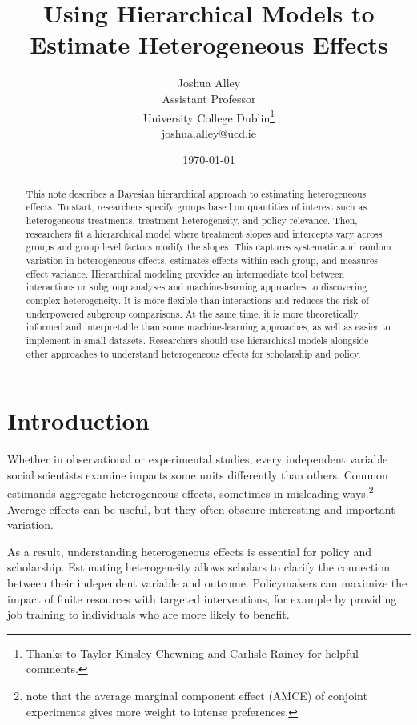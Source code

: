 \documentclass[12pt]{article}
\title{\textbf{Using Hierarchical Models to Estimate Heterogeneous Effects}}
\author{Joshua Alley \\
Assistant Professor \\
University College Dublin\thanks{Thanks to Taylor Kinsley Chewning and Carlisle Rainey for helpful comments.} \\
joshua.alley@ucd.ie
}
\date{\today}
\begin{document}
\maketitle 

\begin{abstract} 
This note describes a Bayesian hierarchical approach to estimating heterogeneous effects. 
To start, researchers specify groups based on quantities of interest such as heterogeneous treatments, treatment heterogeneity, and policy relevance.  
Then, researchers fit a hierarchical model where treatment slopes and intercepts vary across groups and group level factors modify the slopes.
This captures systematic and random variation in heterogeneous effects, estimates effects within each group, and measures effect variance. 
Hierarchical modeling provides an intermediate tool between interactions or subgroup analyses and machine-learning approaches to discovering complex heterogeneity. 
It is more flexible than interactions and reduces the risk of underpowered subgroup comparisons.
At the same time, it is more theoretically informed and interpretable than some machine-learning approaches, as well as easier to implement in small datasets. 
Researchers should use hierarchical models alongside other approaches to understand heterogeneous effects for scholarship and policy.
\end{abstract} 


\newpage 
\doublespace 


\section{Introduction}


Whether in observational or experimental studies, every independent variable social scientists examine impacts some units differently than others. 
Common estimands aggregate heterogeneous effects, sometimes in misleading ways.\footnote{\citet{Abramsonetal2022} note that the average marginal component effect (AMCE) of conjoint experiments gives more weight to intense preferences.} 
Average effects can be useful, but they often obscure interesting and important variation. 


As a result, understanding heterogeneous effects is essential for policy and scholarship. 
Estimating heterogeneity allows scholars to clarify the connection between their independent variable and outcome.
Policymakers can maximize the impact of finite resources with targeted interventions, for example by providing job training to individuals who are more likely to benefit. 
\end{document}
